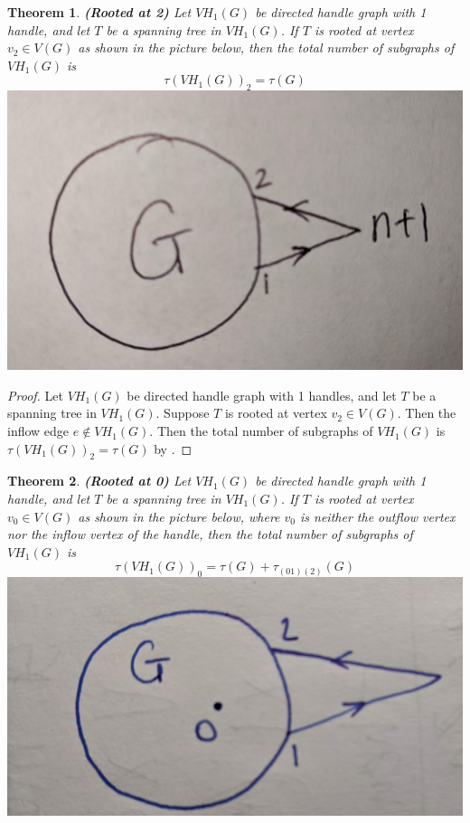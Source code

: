 \documentclass[twoside,11pt]{article}
\newtheorem{theorem}{Theorem}[section]
\numberwithin{equation}{section} \DeclareMathOperator{\Var}{Var}
\newcommand{\bpf}{\begin{proof}}
\newcommand{\epf}{\end{proof}}
\newcommand{\bthm}{\begin{theorem}}
\newcommand{\ethm}{\end{theorem}}
\begin{document}
\bthm
{\bf (Rooted at 2)}
Let $VH_1(G)$ be directed handle graph with 1 handle, and let $T$ be a spanning tree in $VH_1(G)$. If $T$ is rooted at vertex $v_2\in V(G)$ as shown in the picture below,
then the total number of subgraphs of $VH_1(G)$ is  \[
 \tau (VH_1(G))_2 = \tau(G)
\]
\includegraphics[scale=0.025]{graph1_1.jpg}
\ethm

\bpf
Let $VH_1(G)$ be directed handle graph with 1 handles, and let $T$ be a spanning tree in $VH_1(G)$. Suppose $T$ is rooted at vertex $v_2\in V(G)$. Then the inflow edge $e\notin VH_1(G)$. Then the total number of subgraphs of $VH_1(G)$ is  $ \tau (VH_1(G))_2 = \tau(G)$ by .
\epf

\bthm
{\bf (Rooted at 0)}
Let $VH_1(G)$ be directed handle graph with 1 handle, and let $T$ be a spanning tree in $VH_1(G)$. If $T$ is rooted at vertex $v_0\in V(G)$ as shown in the picture below, where $v_0$ is neither the outflow vertex nor the inflow vertex of the handle, 
then the total number of subgraphs of $VH_1(G)$ is  \[
 \tau (VH_1(G))_0 = \tau(G)+\tau_{(01)(2)}(G) 
\]
\includegraphics[scale=0.025]{graph1_0.jpg}
\ethm
\end{document}
